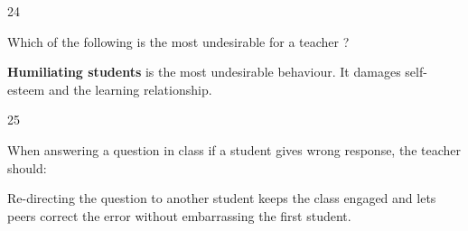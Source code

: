 \begin{question}{24}
{Which of the following is the most undesirable for a teacher ?\par}
\begin{explain}
\textbf{Humiliating students} is the most undesirable behaviour. It damages self-esteem and the learning relationship.
\end{explain}
\end{question}

\begin{question}{25}
{When answering a question in class if a student gives wrong response, the teacher should:\par}
\begin{explain}
Re-directing the question to another student keeps the class engaged and lets peers correct the error without embarrassing the first student.
\end{explain}
\end{question}

